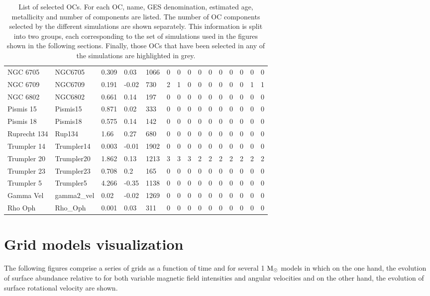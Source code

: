 \documentclass[fleqn,usenatbib]{mnras}
\begin{document}
\begin{table}
\begin{tabular}{|l l l l l || c c c c c | c c c c c|}
            NGC 6705 & NGC6705 & 0.309 & 0.03 & 1066 & 0 & 0 & 0 & 0 & 0 & 0 & 0 & 0 & 0 & 0\\
            \rowcolor{lightgray}
            NGC 6709 & NGC6709 & 0.191 & -0.02 & 730 & 2 & 1 & 0 & 0 & 0 & 0 & 0 & 0 & 1 & 1\\
            NGC 6802 & NGC6802 & 0.661 & 0.14 & 197 & 0 & 0 & 0 & 0 & 0 & 0 & 0 & 0 & 0 & 0\\
            Pismis 15 & Pismis15 & 0.871 & 0.02 & 333 & 0 & 0 & 0 & 0 & 0 & 0 & 0 & 0 & 0 & 0\\
            Pismis 18 & Pismis18 & 0.575 & 0.14 & 142 & 0 & 0 & 0 & 0 & 0 & 0 & 0 & 0 & 0 & 0\\
            Ruprecht 134 & Rup134 & 1.66 & 0.27 & 680 & 0 & 0 & 0 & 0 & 0 & 0 & 0 & 0 & 0 & 0\\
            Trumpler 14 & Trumpler14 & 0.003 & -0.01 & 1902 & 0 & 0 & 0 & 0 & 0 & 0 & 0 & 0 & 0 & 0\\
            \rowcolor{lightgray}
            Trumpler 20 & Trumpler20 & 1.862 & 0.13 & 1213 & 3 & 3 & 3 & 2 & 2 & 2 & 2 & 2 & 2 & 2\\
            Trumpler 23 & Trumpler23 & 0.708 & 0.2 & 165 & 0 & 0 & 0 & 0 & 0 & 0 & 0 & 0 & 0 & 0\\
            Trumpler 5 & Trumpler5 & 4.266 & -0.35 & 1138 & 0 & 0 & 0 & 0 & 0 & 0 & 0 & 0 & 0 & 0\\
            Gamma Vel & gamma2\_vel & 0.02 & -0.02 & 1269 & 0 & 0 & 0 & 0 & 0 & 0 & 0 & 0 & 0 & 0\\
            Rho Oph & Rho\_Oph & 0.001 & 0.03 & 311 & 0 & 0 & 0 & 0 & 0 & 0 & 0 & 0 & 0 & 0\\           
            \hline
	\end{tabular}
 	\caption{List of selected OCs. For each OC, name, GES denomination, estimated age, metallicity and number of components are listed. The number of OC components selected by the different simulations are shown separately. This information is split into two groups, each corresponding to the set of simulations used in the figures shown in the following sections. Finally, those OCs that have been selected in any of the simulations are highlighted in grey.}
  	\label{tab:oc_full_list}
\end{table}


\clearpage
\section{Grid models visualization}
The following figures comprise a series of grids as a function of time and for several 1 $\mathrm{M}_\odot$ models in which on the one hand, the evolution of surface  abundance relative to  for both variable magnetic field intensities and angular velocities and on the other hand, the evolution of surface rotational velocity are shown.
\end{document}
